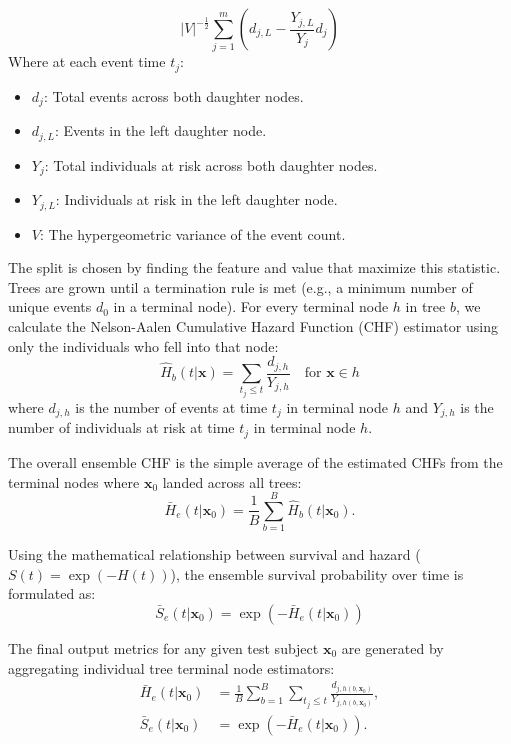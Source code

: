 \documentclass[10pt]{NSP1}
\begin{document}
\begin{equation}
|V|^{-\frac{1}{2}} \sum_{j=1}^{m} \left( d_{j,L} - \frac{Y_{j,L}}{Y_j} d_j \right)
\end{equation}
Where at each event time $t_j$:
\begin{itemize}
    \item $d_j$: Total events across both daughter nodes.
   \item $d_{j,L}$: Events in the left daughter node.
   \item $Y_j$: Total individuals at risk across both daughter nodes.
   \item $Y_{j,L}$: Individuals at risk in the left daughter node.
 \item $V$: The hypergeometric variance of the event count.
\end{itemize}
The split is chosen by finding the feature and value that maximize this statistic. Trees are grown until a termination rule is met (e.g., a minimum number of unique events $d_0$ in a terminal node). For every terminal node $h$ in tree $b$, we calculate the Nelson-Aalen Cumulative Hazard Function (CHF) estimator using only the individuals who fell into that node:
\begin{equation}
\hat{H}_b(t|\mathbf{x}) = \sum_{t_j \leq t} \frac{d_{j,h}}{Y_{j,h}} \quad \text{for } \mathbf{x} \in h
\end{equation}
where $d_{j,h}$ is the number of events at time $t_j$ in terminal node $h$ and $Y_{j,h}$ is the number of individuals at risk at time $t_j$ in terminal node $h$.


The overall ensemble CHF is the simple average of the estimated CHFs from the terminal nodes where $\mathbf{x}_0$ landed across all trees:
\begin{equation}
\bar{H}_e(t|\mathbf{x}_0) = \frac{1}{B} \sum_{b=1}^{B} \hat{H}_b(t|\mathbf{x}_0).
\end{equation}

Using the mathematical relationship between survival and hazard ($S(t) = \exp(-H(t))$), the ensemble survival probability over time is formulated as:
\begin{equation}
\bar{S}_e(t|\mathbf{x}_0) = \exp \left( -\bar{H}_e(t|\mathbf{x}_0) \right)
\end{equation}

The final output metrics for any given test subject $\mathbf{x}_0$ are generated by aggregating individual tree terminal node estimators:
\begin{align}
\bar{H}_e(t|\mathbf{x}_0) &= \frac{1}{B} \sum_{b=1}^{B} \sum_{t_j \leq t} \frac{d_{j,h(b,\mathbf{x}_0)}}{Y_{j,h(b,\mathbf{x}_0)}}, \\
\bar{S}_e(t|\mathbf{x}_0) &= \exp \left( -\bar{H}_e(t|\mathbf{x}_0) \right).
\end{align}
\end{document}
